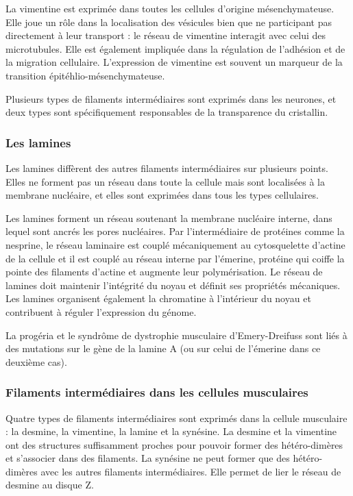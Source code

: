 \documentclass{report}
\begin{document}
La vimentine est exprimée dans toutes les cellules d'origine mésenchymateuse. Elle joue un rôle dans la localisation des vésicules bien que ne participant pas directement à leur transport : le réseau de vimentine interagit avec celui des microtubules. Elle est également impliquée dans la régulation de l'adhésion et de la migration cellulaire. 
L'expression de vimentine est souvent un marqueur de la transition épitéhlio-mésenchymateuse. 

Plusieurs types de filaments intermédiaires sont exprimés dans les neurones, et deux types sont spécifiquement responsables de la transparence du cristallin. 

\subsubsection{Les lamines}

Les lamines diffèrent des autres filaments intermédiaires sur plusieurs points. Elles ne forment pas un réseau dans toute la cellule mais sont localisées à la membrane nucléaire, et elles sont exprimées dans tous les types cellulaires. 

Les lamines forment un réseau soutenant la membrane nucléaire interne, dans lequel sont ancrés les pores nucléaires. Par l'intermédiaire de protéines comme la nesprine, le réseau laminaire est couplé mécaniquement au cytosquelette d'actine de la cellule et il est couplé au réseau interne par l'émerine, protéine qui coiffe la pointe des filaments d'actine et augmente leur polymérisation. 
Le réseau de lamines doit maintenir l'intégrité du noyau et définit ses propriétés mécaniques. 
Les lamines organisent également la chromatine à l'intérieur du noyau et contribuent à réguler l'expression du génome. 

La progéria et le syndrôme de dystrophie musculaire d'Emery-Dreifuss sont liés à des mutations sur le gène de la lamine A (ou sur celui de l'émerine dans ce deuxième cas). 


\subsubsection{Filaments intermédiaires dans les cellules musculaires}

Quatre types de filaments intermédiaires sont exprimés dans la cellule musculaire : la desmine, la vimentine, la lamine et la synésine. 
La desmine et la vimentine ont des structures suffisamment proches pour pouvoir former des hétéro-dimères et s'associer dans des filaments. La synésine ne peut former que des hétéro-dimères avec les autres filaments intermédiaires. Elle permet de lier le réseau de desmine au disque Z. 
\end{document}

